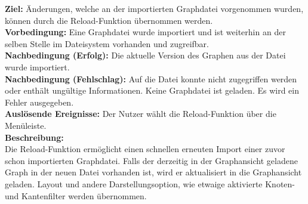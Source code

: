 \label{fa:reload}
\textbf{Ziel:} Änderungen, welche an der importierten Graphdatei vorgenommen wurden, können durch die Reload-Funktion übernommen werden.\\
\textbf{Vorbedingung:} Eine Graphdatei wurde importiert und ist weiterhin an der selben Stelle im Dateisystem vorhanden und zugreifbar.\\
\textbf{Nachbedingung (Erfolg):} Die aktuelle Version des Graphen aus der Datei wurde importiert.\\
\textbf{Nachbedingung (Fehlschlag):} Auf die Datei konnte nicht zugegriffen werden oder enthält ungültige Informationen. Keine Graphdatei ist geladen. Es wird ein Fehler ausgegeben.\\
\textbf{Auslösende Ereignisse:} Der Nutzer wählt die Reload-Funktion über die Menüleiste.\\
\textbf{Beschreibung:}\\
Die Reload-Funktion ermöglicht einen schnellen erneuten Import einer zuvor schon importierten Graphdatei.
Falls der derzeitig in der Graphansicht geladene Graph in der neuen Datei vorhanden ist, wird er aktualisiert in die Graphansicht geladen.
Layout und andere Darstellungsoption, wie etwaige aktivierte Knoten- und Kantenfilter werden übernommen.

%
